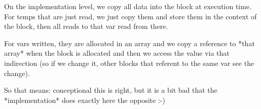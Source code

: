 
On the implementation level, we copy all data into the block at execution time. For temps that are just read, we just copy them and
store them in the context of the block, then all reads to that var read from there.

For vars written, they are allocated in an array and we copy a reference to *that array* when the block is allocated and then we access
the value via that indirection (so if we change it, other blocks that referent to the same var see the change).

So that means: conceptional this is right, but it is a bit bad that the *implementation* does exactly here the opposite :-)

